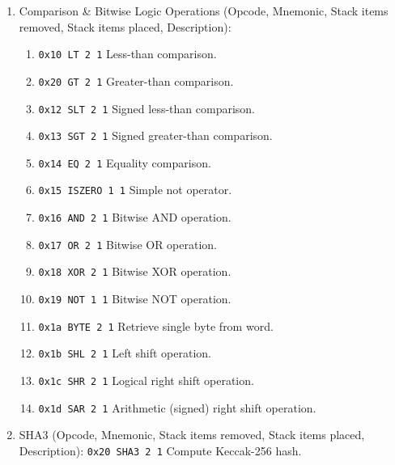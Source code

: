 \begin{enumerate}
\item Comparison \& Bitwise Logic Operations (Opcode, Mnemonic, Stack items removed, Stack items placed, Description):
\begin{enumerate}
\item\verb|0x10 LT 2 1| Less-than comparison.
\item\verb|0x20 GT 2 1| Greater-than comparison.
\item\verb|0x12 SLT 2 1| Signed less-than comparison.
\item\verb|0x13 SGT 2 1| Signed greater-than comparison.
\item\verb|0x14 EQ 2 1| Equality comparison.
\item\verb|0x15 ISZERO 1 1| Simple not operator.
\item\verb|0x16 AND 2 1| Bitwise AND operation.
\item\verb|0x17 OR 2 1| Bitwise OR operation.
\item\verb|0x18 XOR 2 1| Bitwise XOR operation.
\item\verb|0x19 NOT 1 1| Bitwise NOT operation.
\item\verb|0x1a BYTE 2 1| Retrieve single byte from word.
\item\verb|0x1b SHL 2 1| Left shift operation.
\item\verb|0x1c SHR 2 1| Logical right shift operation.
\item\verb|0x1d SAR 2 1| Arithmetic (signed) right shift operation.
\end{enumerate}

\item SHA3 (Opcode, Mnemonic, Stack items removed, Stack items placed, Description): \verb|0x20 SHA3 2 1| Compute Keccak-256 hash.


\end{enumerate}
